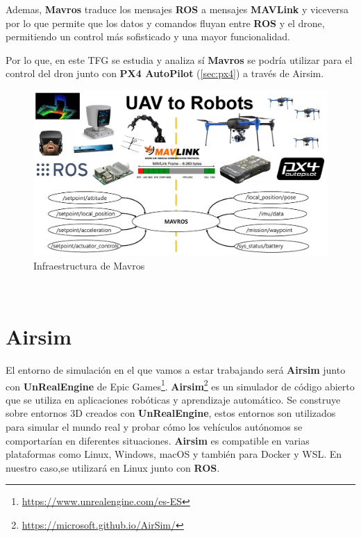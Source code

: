 Ademas, \textbf{Mavros} traduce los mensajes \textbf{ROS} a mensajes \textbf{MAVLink} y viceversa por lo que permite que los datos y comandos fluyan entre \textbf{ROS} y el drone, 
permitiendo un control más sofisticado y una mayor funcionalidad. \newline

Por lo que, en este TFG se estudia y analiza sí \textbf{Mavros} se podría utilizar para el control del dron junto con \textbf{PX4 AutoPilot} (\ref{sec:px4}) a través
de Airsim. \newline

\begin{figure} [H]
  \begin{center}
    \includegraphics[scale=0.3]{figs/Plataformas_Desarollo/mavros.jpg}
  \end{center}
  \caption{Infraestructura de Mavros}
  \label{fig:InfraROS}
\end{figure}\


\section{Airsim}
\label{sec:Airsim}
El entorno de simulación en el que vamos a estar trabajando será \textbf{Airsim} junto con \textbf{UnRealEngine} de Epic Games\footnote{\url{https://www.unrealengine.com/es-ES}}. \textbf{Airsim}\footnote{\url{https://microsoft.github.io/AirSim/}} es un simulador de código abierto que se utiliza en aplicaciones robóticas 
y aprendizaje automático.
Se construye sobre entornos 3D creados con \textbf{UnRealEngine}, estos entornos son utilizados para simular el mundo real y probar 
cómo los vehículos autónomos se comportarían en diferentes situaciones. \textbf{Airsim} es compatible en varias plataformas como Linux, Windows, macOS y también para Docker y WSL. En nuestro caso,se utilizará en Linux junto
con \textbf{ROS}. \newline

